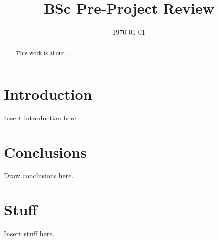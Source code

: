 \documentclass[sotoncolour]{uosarticle}
\title       {BSc Pre-Project Review}
\date        {\today}
\begin{document}
\frontmatter
\maketitle
\begin{abstract}
This work is about \dots
\end{abstract}
\mainmatter
\section{Introduction} \label{sec:Introduction}
Insert introduction here.

\section{Conclusions} \label{sec:Conclusions}
Draw conclusions here.
\backmatter
\appendix


\section{Stuff} \label{Section:Stuff}
Insert stuff here.
\end{document}
